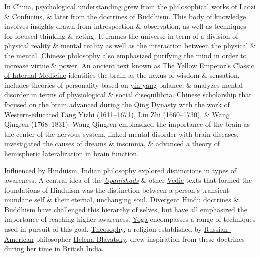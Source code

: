 \documentclass[oneside]{book}
\numberwithin{equation}{section}
\begin{document}
In China, psychological understanding grew from the philosophical works of \href{https://en.wikipedia.org/wiki/Laozi}{Laozi} \& \href{https://en.wikipedia.org/wiki/Confucius}{Confucius}, \& later from the doctrines of \href{https://en.wikipedia.org/wiki/Buddhism}{Buddhism}. This body of knowledge involves insights drawn from introspection \& observation, as well as techniques for focused thinking \& acting. It frames the universe in term of a division of physical reality \& mental reality as well as the interaction between the physical \& the mental. Chinese philosophy also emphasized purifying the mind in order to increase virtue \& power. An ancient text known as \href{https://en.wikipedia.org/wiki/Huangdi_Neijing}{The Yellow Emperor's Classic of Internal Medicine} identifies the brain as the nexus of wisdom \& sensation, includes theories of personality based on \href{https://en.wikipedia.org/wiki/Yin_and_yang}{yin-yang} balance, \& analyzes mental disorder in terms of physiological \& social disequilibria. Chinese scholarship that focused on the brain advanced during the \href{https://en.wikipedia.org/wiki/Qing_Dynasty}{Qing Dynasty} with the work of Western-educated Fang Yizhi (1611--1671), \href{https://en.wikipedia.org/wiki/Liu_Zhi_(scholar)}{Liu Zhi} (1660--1730), \& Wang Qingren (1768--1831). Wang Qingren emphasized the importance of the brain as the center of the nervous system, linked mental disorder with brain diseases, investigated the causes of dreams \& \href{https://en.wikipedia.org/wiki/Insomnia}{insomnia}, \& advanced a theory of \href{https://en.wikipedia.org/wiki/Lateralization_of_brain_function}{hemispheric lateralization} in brain function.

Influenced by \href{https://en.wikipedia.org/wiki/Hinduism}{Hinduism}, \href{https://en.wikipedia.org/wiki/Indian_philosophy}{Indian philosophy} explored distinctions in types of awareness. A central idea of the \href{https://en.wikipedia.org/wiki/Upanishads}{\textit{Upanishads}} \& other \href{https://en.wikipedia.org/wiki/Vedic_period}{Vedic} texts that formed the foundations of Hinduism was the distinction between a person's transient mundane self \& their \href{https://en.wikipedia.org/wiki/%C4%80tman_(Hinduism)}{eternal, unchanging soul}. Divergent Hindu doctrines \& \href{https://en.wikipedia.org/wiki/Buddhism}{Buddhism} have challenged this hierarchy of selves, but have all emphasized the importance of reaching higher awareness. \href{https://en.wikipedia.org/wiki/Yoga}{Yoga} encompasses a range of techniques used in pursuit of this goal. \href{https://en.wikipedia.org/wiki/Theosophy}{Theosophy}, a religion established by \href{https://en.wikipedia.org/wiki/Russian_Americans}{Russian--American} philosopher \href{https://en.wikipedia.org/wiki/Helena_Blavatsky}{Helena Blavatsky}, drew inspiration from these doctrines during her time in \href{https://en.wikipedia.org/wiki/British_Raj}{British India}.
\end{document}
